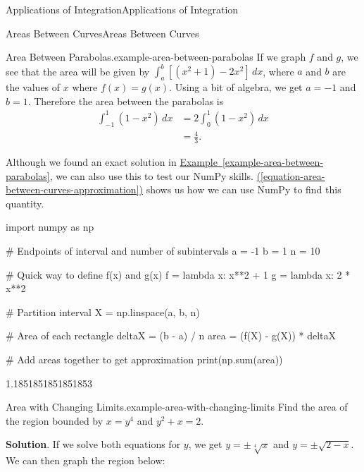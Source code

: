 \documentclass[10pt,]{book}
\numberwithin{equation}{section}
\newcommand{\amp}{&}
\begin{document}
\begin{chapterptx}{Applications of Integration}{}{Applications of Integration}{}{}
\begin{sectionptx}{Areas Between Curves}{}{Areas Between Curves}{}{}
\begin{example}{Area Between Parabolas.}{example-area-between-parabolas}
\hypertarget{p-618}{}%
If we graph \(f\) and \(g\), we see that the area will be given by \(\int_{a}^{b}[(x^{2} + 1) - 2x^{2}]\,dx\), where \(a\) and \(b\) are the values of \(x\) where \(f(x) = g(x)\). Using a bit of algebra, we get \(a = -1\) and \(b = 1\). Therefore the area between the parabolas is%
\begin{align*}
\int_{-1}^{1}(1 - x^{2})\,dx \amp = 2\int_{0}^{1}(1-x^{2})\,dx \\
\amp = \frac{4}{3}. 
\end{align*}
%
\end{example}
\hypertarget{p-619}{}%
Although we found an exact solution in \hyperref[example-area-between-parabolas]{Example~\ref{example-area-between-parabolas}}, we can also use this to test our NumPy skills. \hyperref[equation-area-between-curves-approximation]{(\ref{equation-area-between-curves-approximation})} shows us how we can use NumPy to find this quantity.%
\begin{sageinput}
import numpy as np

# Endpoints of interval and number of subintervals
a = -1
b = 1
n = 10

# Quick way to define f(x) and g(x)
f = lambda x: x**2 + 1
g = lambda x: 2 * x**2

# Partition interval
X = np.linspace(a, b, n)

# Area of each rectangle
deltaX = (b - a) / n
area = (f(X) - g(X)) * deltaX

# Add areas together to get approximation
print(np.sum(area))
\end{sageinput}
\begin{sageoutput}
1.1851851851851853
\end{sageoutput}
\begin{example}{Area with Changing Limits.}{example-area-with-changing-limits}%
\hypertarget{p-620}{}%
Find the area of the region bounded by \(x = y^{4}\) and \(y^{2} + x = 2\).%
\par\smallskip%
\noindent\textbf{Solution}.\hypertarget{solution-135}{}\quad%
\hypertarget{p-621}{}%
If we solve both equations for \(y\), we get \(y = \pm\sqrt[4]{x}\) and \(y = \pm\sqrt{2 - x}\). We can then graph the region below:%
\begin{figure}
\centering
{
}
\end{figure}
\end{example}
\end{sectionptx}
\end{chapterptx}
\end{document}
